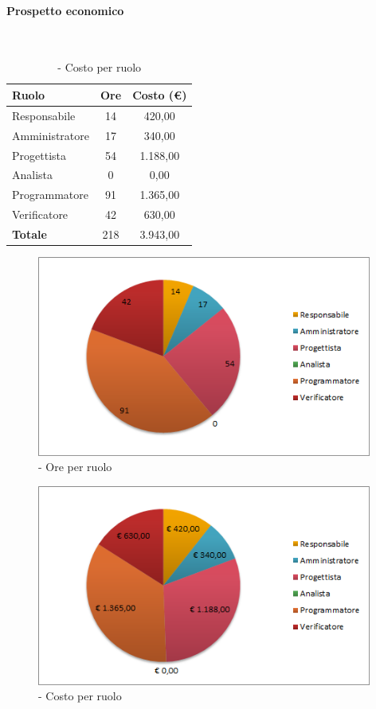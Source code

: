 \documentclass[./PianoDiProgetto.tex]{subfiles}
\begin{document}
	\paragraph{Prospetto economico}\
					
	\begin{table}[H]
		\centering
	
		\begin{tabular}{l * {2}{c}}
			\toprule
			\textbf{Ruolo} & \textbf{Ore} & \textbf{Costo (\euro{})} \\
			\midrule
			Responsabile & 14    &  420,00 \\
			Amministratore  & 17    &  340,00 \\
			Progettista  & 54   &  1.188,00 \\
			Analista & 0    &  0,00 \\
			Programmatore  & 91    &  1.365,00 \\
			Verificatore  & 42    &  630,00 \\
			\midrule
			\textbf{Totale}  & 218   &  3.943,00 \\
			\bottomrule
		\end{tabular}
		\caption{\PerC{} - Costo per ruolo}
	\end{table}

\vspace{35mm}
	
	\begin{figure}[H]
		\centering
		\includegraphics[width=11cm, trim=1cm 0cm 1cm 0cm]{grafici/C-ruolo}
			\caption{\PerC{} - Ore per ruolo}
	\end{figure}
\vfill
	\begin{figure}[H]
		\centering
		\includegraphics[width=11cm, trim=1cm 0cm 1cm 0cm]{grafici/C-costo}
			\caption{\PerC{} - Costo per ruolo}
	\end{figure}
	
\end{document}
